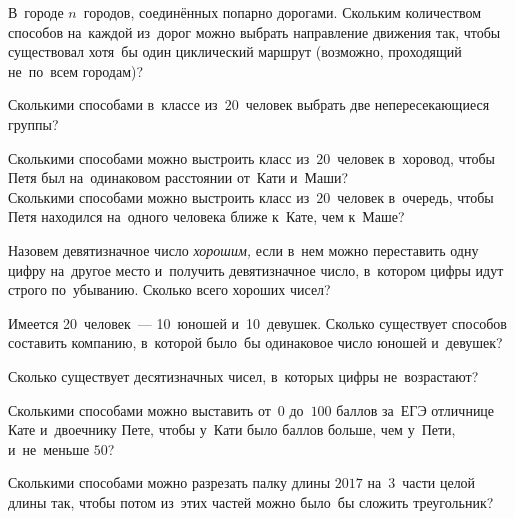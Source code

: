 



\begin{problems}

\item
В~городе $n$~городов, соединённых попарно дорогами.
Скольким количеством способов на~каждой из~дорог можно выбрать направление
движения так, чтобы существовал хотя~бы один циклический маршрут
(возможно, проходящий не~по~всем городам)?

\item
Сколькими способами в~классе из~$20$~человек выбрать две непересекающиеся
группы?

\item
\subproblem
Сколькими способами можно выстроить класс из~$20$~человек в~хоровод, чтобы Петя
был на~одинаковом расстоянии от~Кати и~Маши?
\\
\subproblem
Сколькими способами можно выстроить класс из~$20$~человек в~очередь, чтобы
Петя находился на~одного человека ближе к~Кате, чем к~Маше?

\item
Назовем девятизначное число \emph{хорошим,} если в~нем можно переставить одну
цифру на~другое место и~получить девятизначное число, в~котором цифры идут
строго по~убыванию.
Сколько всего хороших чисел?

\item
Имеется 20~человек~--- 10~юношей и~10~девушек.
Сколько существует способов составить компанию, в~которой было~бы одинаковое
число юношей и~девушек?

\item
Сколько существует десятизначных чисел, в~которых цифры не~возрастают?

\item
Сколькими способами можно выставить от~$0$ до~$100$ баллов за~ЕГЭ
отличнице Кате и~двоечнику Пете, чтобы у~Кати было баллов больше, чем у~Пети,
и~не~меньше $50$?

\item
Сколькими способами можно разрезать палку длины $2017$ на~$3$~части целой длины
так, чтобы потом из~этих частей можно было~бы сложить треугольник?


\end{problems}
